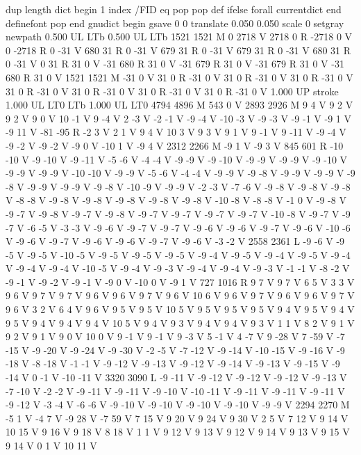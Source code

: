 {{{{{dup length dict begin {1 index /FID eq {pop pop} {def} ifelse} forall
currentdict end definefont pop
end
gnudict begin
gsave
0 0 translate
0.050 0.050 scale
0 setgray
newpath
0.500 UL
LTb
0.500 UL
LTb
1521 1521 M
0 2718 V
2718 0 R
-2718 0 V
0 -2718 R
0 -31 V
680 31 R
0 -31 V
679 31 R
0 -31 V
679 31 R
0 -31 V
680 31 R
0 -31 V
0 31 R
31 0 V
-31 680 R
31 0 V
-31 679 R
31 0 V
-31 679 R
31 0 V
-31 680 R
31 0 V
1521 1521 M
-31 0 V
31 0 R
-31 0 V
31 0 R
-31 0 V
31 0 R
-31 0 V
31 0 R
-31 0 V
31 0 R
-31 0 V
31 0 R
-31 0 V
31 0 R
-31 0 V
1.000 UP
stroke
1.000 UL
LT0
LTb
1.000 UL
LT0
4794 4896 M
543 0 V
2893 2926 M
9 4 V
9 2 V
9 2 V
9 0 V
10 -1 V
9 -4 V
2 -3 V
-2 -1 V
-9 -4 V
-10 -3 V
-9 -3 V
-9 -1 V
-9 1 V
-9 11 V
-81 -95 R
-2 3 V
2 1 V
9 4 V
10 3 V
9 3 V
9 1 V
9 -1 V
9 -11 V
-9 -4 V
-9 -2 V
-9 -2 V
-9 0 V
-10 1 V
-9 4 V
2312 2266 M
-9 1 V
-9 3 V
845 601 R
-10 -10 V
-9 -10 V
-9 -11 V
-5 -6 V
-4 -4 V
-9 -9 V
-9 -10 V
-9 -9 V
-9 -9 V
-9 -10 V
-9 -9 V
-9 -9 V
-10 -10 V
-9 -9 V
-5 -6 V
-4 -4 V
-9 -9 V
-9 -8 V
-9 -9 V
-9 -9 V
-9 -8 V
-9 -9 V
-9 -9 V
-9 -8 V
-10 -9 V
-9 -9 V
-2 -3 V
-7 -6 V
-9 -8 V
-9 -8 V
-9 -8 V
-8 -8 V
-9 -8 V
-9 -8 V
-9 -8 V
-9 -8 V
-9 -8 V
-10 -8 V
-8 -8 V
-1 0 V
-9 -8 V
-9 -7 V
-9 -8 V
-9 -7 V
-9 -8 V
-9 -7 V
-9 -7 V
-9 -7 V
-9 -7 V
-10 -8 V
-9 -7 V
-9 -7 V
-6 -5 V
-3 -3 V
-9 -6 V
-9 -7 V
-9 -7 V
-9 -6 V
-9 -6 V
-9 -7 V
-9 -6 V
-10 -6 V
-9 -6 V
-9 -7 V
-9 -6 V
-9 -6 V
-9 -7 V
-9 -6 V
-3 -2 V
2558 2361 L
-9 -6 V
-9 -5 V
-9 -5 V
-10 -5 V
-9 -5 V
-9 -5 V
-9 -5 V
-9 -4 V
-9 -5 V
-9 -4 V
-9 -5 V
-9 -4 V
-9 -4 V
-9 -4 V
-10 -5 V
-9 -4 V
-9 -3 V
-9 -4 V
-9 -4 V
-9 -3 V
-1 -1 V
-8 -2 V
-9 -1 V
-9 -2 V
-9 -1 V
-9 0 V
-10 0 V
-9 1 V
727 1016 R
9 7 V
9 7 V
6 5 V
3 3 V
9 6 V
9 7 V
9 7 V
9 6 V
9 6 V
9 7 V
9 6 V
10 6 V
9 6 V
9 7 V
9 6 V
9 6 V
9 7 V
9 6 V
3 2 V
6 4 V
9 6 V
9 5 V
9 5 V
10 5 V
9 5 V
9 5 V
9 5 V
9 4 V
9 5 V
9 4 V
9 5 V
9 4 V
9 4 V
9 4 V
10 5 V
9 4 V
9 3 V
9 4 V
9 4 V
9 3 V
1 1 V
8 2 V
9 1 V
9 2 V
9 1 V
9 0 V
10 0 V
9 -1 V
9 -1 V
9 -3 V
5 -1 V
4 -7 V
9 -28 V
7 -59 V
-7 -15 V
-9 -20 V
-9 -24 V
-9 -30 V
-2 -5 V
-7 -12 V
-9 -14 V
-10 -15 V
-9 -16 V
-9 -18 V
-8 -18 V
-1 -1 V
-9 -12 V
-9 -13 V
-9 -12 V
-9 -14 V
-9 -13 V
-9 -15 V
-9 -14 V
0 -1 V
-10 -11 V
3320 3090 L
-9 -11 V
-9 -12 V
-9 -12 V
-9 -12 V
-9 -13 V
-7 -10 V
-2 -2 V
-9 -11 V
-9 -11 V
-9 -10 V
-10 -11 V
-9 -11 V
-9 -11 V
-9 -11 V
-9 -12 V
-3 -4 V
-6 -6 V
-9 -10 V
-9 -10 V
-9 -10 V
-9 -10 V
-9 -9 V
2294 2270 M
-5 1 V
-4 7 V
-9 28 V
-7 59 V
7 15 V
9 20 V
9 24 V
9 30 V
2 5 V
7 12 V
9 14 V
10 15 V
9 16 V
9 18 V
8 18 V
1 1 V
9 12 V
9 13 V
9 12 V
9 14 V
9 13 V
9 15 V
9 14 V
0 1 V
10 11 V
}}}}}
